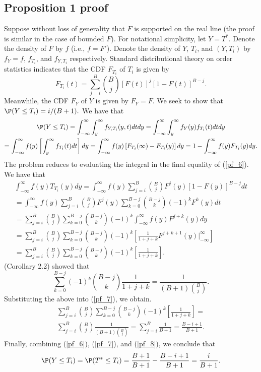 \documentclass[12pt]{article}
\begin{document}
\printbibliography
\begin{appendices}
\subsection*{Proposition 1 proof}
Suppose without loss of generality that $F$ is supported on the real line (the proof is similar in the case of bounded $F$).  For notational simplicity, let $Y = T^*$. Denote the density of $F$ by $f$ (i.e., $f = F'$). Denote the density of $Y$, $T_i$, and $(Y,T_i)$ by $f_Y = f$, $f_{T_i}$, and $f_{Y, T_i}$ respectively. Standard distributional theory on order statistics indicates that the CDF $F_{T_i}$ of $T_i$ is given by $$ F_{T_i}(t) = \sum_{j=i}^B \binom{B}{j}[F(t)]^j [1 - F(t)]^{B-j}.$$ Meanwhile, the CDF $F_Y$ of $Y$ is given by $F_Y = F$. We seek to show that $\P(Y \leq T_i) = i/(B+1).$ We have that
\begin{multline}\label{pf_6}
\P(Y \leq T_i) = \int_{-\infty}^{\infty} \int_{y}^\infty f_{Y,T_i}(y,t) dt dy = \int_{-\infty}^{\infty} \int_{y}^\infty f_Y(y)f_{T_i}(t) dt dy \\ = \int_{-\infty}^\infty f(y) \left[\int_{y}^\infty f_{T_i}(t) dt \right] dy = \int_{-\infty}^\infty f(y) \left[ F_{T_i}(\infty) - F_{T_i}(y) \right] dy = 1 - \int_{-\infty}^\infty f(y) F_{T_i}(y)dy. 
\end{multline}
The problem reduces to evaluating the integral in the final equality of (\ref{pf_6}). We have that
\begin{multline}\label{pf_7}
\int_{-\infty}^\infty f(y) T_{T_i}(y) dy = \int_{-\infty}^\infty f(y) \sum_{j=i}^B \binom{B}{j}F^j(y) [1 - F(y)]^{B-j}dt \\ = \int_{-\infty}^\infty f(y) \sum_{j=i}^B \binom{B}{j} F^j(y) \sum_{k=0}^{B-j}\binom{B-j}{k} (-1)^k F^k(y) dt\\ = \sum_{j=i}^B \binom{B}{j} \sum_{k=0}^{B-j} \binom{B-j}{k}(-1)^k\int_{-\infty}^\infty f(y) F^{j+k}(y) dy \\ = \sum_{j=i}^B \binom{B}{j} \sum_{k=0}^{B-j} \binom{B-j}{k} (-1)^k \left[ \frac{1}{1+j+k} F^{j+k+1}(y)|^\infty_{-\infty} \right] \\ = \sum_{j=i}^B \binom{B}{j} \sum_{k=0}^{B-j} \binom{B-j}{k} (-1)^k \left[ \frac{1}{1+j+k}\right].
\end{multline}
\cite{Sury2004} (Corollary 2.2) showed that
$$ \sum_{k=0}^{B-j} (-1)^k \binom{B-j}{k} \frac{1}{1 + j + k} = \frac{1}{(B + 1) \binom{ B  }{j}}.$$
Substituting the above into (\ref{pf_7}), we obtain.
\begin{multline}\label{pf_8}
\sum_{j=i}^B \binom{B}{j} \sum_{k=0}^{B-j} \binom{B-j}{k} (-1)^k \left[ \frac{1}{1+j+k}\right] =  \\ \sum_{j=i}^B \binom{B}{j} \frac{1}{(B+1)\binom{B}{j}} = \sum_{j=i}^B \frac{1}{B+1} = \frac{B-i+1}{B+1}.
\end{multline}
Finally, combining (\ref{pf_6}), (\ref{pf_7}), and (\ref{pf_8}), we conclude that
$$\P(Y \leq T_i) = \P(T^* \leq T_i) = \frac{B+1}{B+1} - \frac{B-i+1}{B+1} = \frac{i}{B+1}.$$


\end{appendices}
\end{document}
